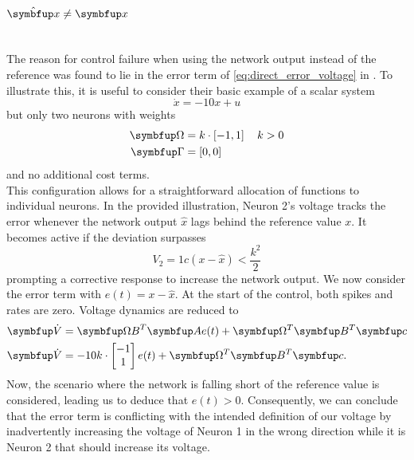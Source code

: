 \paragraph{$\hat{\bmu{x}} \neq \bmu{x}$}\mbox{}\\
The reason for control failure when using the network output instead of the reference was found to lie in the error term of \cref{eq:direct_error_voltage} in \cite{huang_spiking_2019}. To illustrate this, it is useful to consider their basic example of a scalar system
\begin{equation}
\dot{x} = -10x + u
\end{equation}
but only two neurons with weights
\begin{equation}
\begin{aligned}
\bmu{\Omega} &= k\cdot\left[-1 , 1\right] \quad k>0\\
\bmu{\Gamma} &= \left[0,0\right]
\end{aligned}
\end{equation}
and no additional cost terms.\\
This configuration allows for a straightforward allocation of functions to individual neurons. In the provided illustration, Neuron 2's voltage tracks the error whenever the network output $\hat{x}$ lags behind the reference value $x$. It becomes active if the deviation surpasses
\begin{equation}
V_2 = 1c\left(x-\hat{x} \right) < \frac{k^2}{2}
\end{equation}
prompting a corrective response to increase the network output. We now consider the error term with $e(t) = x-\hat{x}$. At the start of the control, both spikes and rates are zero. Voltage dynamics are reduced to
\begin{equation}
\begin{aligned}
\bmu{\dot{V}}&= \bmu{\Omega B}^T \bmu{A}e(t) + \bmu{\Omega}^T\bmu{B}^T\bmu{c}\\
\bmu{\dot{V}}&=  -10k \cdot\begin{bmatrix}-1\\1\end{bmatrix}e(t) + \bmu{\Omega}^T\bmu{B}^T\bmu{c}.
\end{aligned}
\end{equation}
Now, the scenario where the network is falling short of the reference value is considered, leading us to deduce that $e(t)>0$. Consequently, we can conclude that the error term is conflicting with the intended definition of our voltage by inadvertently increasing the voltage of Neuron 1 in the wrong direction while it is Neuron 2 that should increase its voltage.\\
